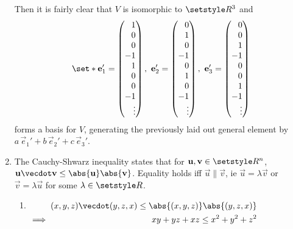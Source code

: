 \documentclass[fleqn,a4paper,11pt]{article}
\begin{document}
\begin{enumerate}[label=\textbf{\arabic*.}]
    Then it is fairly clear that \(V\) is isomorphic to \(\Reals^3\) and
    \begin{equation*}
     \set*{
      \vec e_1'
       =
       \begin{pmatrix*}[r]
        1 \\ 0 \\ 0 \\ -1 \\ 1 \\ 0 \\ 0 \\ -1 \\ \vdots
       \end{pmatrix*},
    \ \vec e_2'
       =
       \begin{pmatrix*}[r]
        0 \\ 1 \\ 0 \\ -1 \\ 0 \\ 1 \\ 0 \\ -1 \\ \vdots
       \end{pmatrix*},
    \ \vec e_3'
       =
       \begin{pmatrix*}[r]
        0 \\ 0 \\ 1 \\ -1 \\ 0 \\ 0 \\ 1 \\ -1 \\ \vdots
       \end{pmatrix*}
      }
    \end{equation*}
    forms a basis for \(V\), generating the previously laid out general element
    by \(a\,\vec e_1' + b\,\vec e_2' + c\,\vec e_3'\).
   \item
    The Cauchy-Shwarz inequality states that for
    \(\vec u, \vec v \in \Reals^n\),
    \(\vec u \vecdot \vec v \le \abs{\vec u} \abs{\vec v}\).
    Equality holds iff \(\vec u \parallel \vec v\), ie
    \(\vec u = \lambda \vec v\) or \(\vec v = \lambda \vec u\) for some
    \(\lambda \in \Reals\).
    \begin{enumerate}[label=(\alph*)]
     \item \(
      \begin{alignedat}[t]2
       && (x, y, z) \vecdot (y, z, x) \le \abs{(x, y, z)} \abs{(y, z, x)} \\
       \implies{}&& xy + yz + xz \le x^2 + y^2 + z^2
      \end{alignedat} \)


\end{enumerate}
\end{enumerate}
\end{document}
